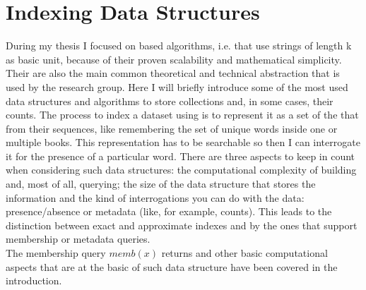 \section{Indexing Data Structures}
During my thesis I focused on \kmer based algorithms, i.e. that use strings of length k as basic unit, because of their proven scalability and mathematical simplicity. Their are also the main common theoretical and technical abstraction that is used by the research group.  
Here I will briefly introduce some of the most used data structures and algorithms to store collections \kmers and, in some cases, their counts. The process to index a dataset using \kmers is to represent it as a set of the \kmers that from their sequences, like remembering the set of unique words inside one or multiple books. This representation has to be searchable so then I can interrogate it for the presence of a particular word.  There are three aspects to keep in count when considering such data structures: the computational complexity of building and, most of all, querying; the size of the data structure that stores the information and the kind of interrogations you can do with the data: presence/absence or metadata (like, for example, counts). This leads to the distinction between exact and approximate indexes and by the ones that support membership or metadata queries.\\
The membership query $memb(x)$ returns 
\kmers and other basic computational aspects that are at the basic of such data structure have been covered in the introduction.

